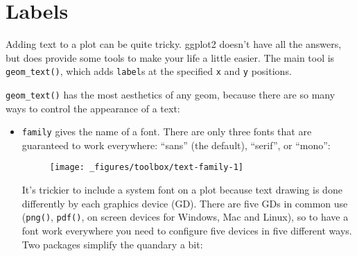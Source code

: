 \hypertarget{sec:labelling}{%
\section{Labels}\label{sec:labelling}}

  

Adding text to a plot can be quite tricky. ggplot2 doesn't have all the
answers, but does provide some tools to make your life a little easier.
The main tool is \texttt{geom\_text()}, which adds \texttt{label}s at
the specified \texttt{x} and \texttt{y} positions.

\texttt{geom\_text()} has the most aesthetics of any geom, because there
are so many ways to control the appearance of a text:

\begin{itemize}
\item
  \texttt{family} gives the name of a font. There are only three fonts
  that are guaranteed to work everywhere: ``sans'' (the default),
  ``serif'', or ``mono'':

\begin{Shaded}
\begin{Highlighting}[]
\StringTok{ }\NormalTok{(} \NormalTok{, } \OperatorTok{:}\NormalTok{, } \NormalTok{(}\NormalTok{, }\NormalTok{, }\NormalTok{))}
\OperatorTok{+}\StringTok{ }
\StringTok{  }\NormalTok{(}\NormalTok{(}
\end{Highlighting}
\end{Shaded}

  \begin{figure}[H]
    \texttt{[image: \_figures/toolbox/text-family-1]}
  \end{figure}

  It's trickier to include a system font on a plot because text drawing
  is done differently by each graphics device (GD). There are five GDs
  in common use (\texttt{png()}, \texttt{pdf()}, on screen devices for
  Windows, Mac and Linux), so to have a font work everywhere you need to
  configure five devices in five different ways. Two packages simplify
  the quandary a bit:


\end{itemize}
